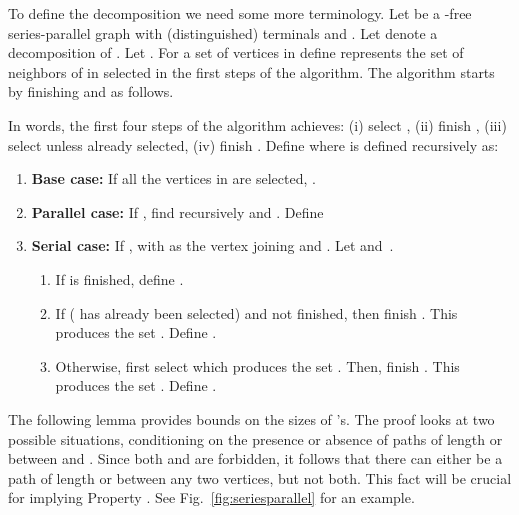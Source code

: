 \documentclass[11pt]{article}
\newcommand{\FI}[1]{Fig.\ \ref{#1}}
\begin{document}
To define the decomposition we need some more terminology. Let  be a -free series-parallel graph with (distinguished) terminals  and .  Let  denote a decomposition of . Let . For a set of vertices  in  define 
  represents the set of neighbors of  in  selected in the first  steps of the algorithm. The algorithm starts by finishing  and  as follows.  
  
In words, the first four steps of the algorithm achieves: (i) select , (ii) finish , (iii) select  unless already selected, (iv) finish . Define  
 where  is defined recursively as:

\begin{enumerate}
\item \textbf{Base case:} If all the vertices in  are selected, . 
\item \textbf{Parallel case:} If , find recursively  and . Define 
  
\item \textbf{Serial case:} If , with  as the vertex joining  and . Let   and~.
\begin{enumerate}
\item If  is finished, define . \item If  ( has already been selected) and  not finished, then finish . This produces the set . Define . \item Otherwise, first select  which produces the set . Then,  finish . This produces the set . Define . 
\end{enumerate}
 \end{enumerate}

The following lemma provides  bounds on the sizes of 's.  The proof looks at two possible situations, conditioning on the presence or absence of paths of length  or  between  and .  Since both  and  are forbidden, it follows that there can either be a path of length  or  between any two vertices, but not both. This fact will be crucial for implying Property . See \FI{fig:seriesparallel} for an example.
\end{document}
